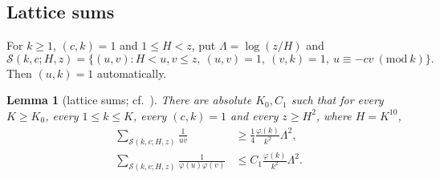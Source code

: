 \documentclass[10pt,reqno]{amsart}
\newtheorem{lemma}[theorem]{Lemma}
\theoremstyle{remark}
\newcommand{\Sset}{\mathcal S}
\begin{document}
\subsection*{Lattice sums}
For $k\geq1$, $(c,k)=1$ and $1\leq H<z$, put $\Lambda=\log(z/H)$ and
\[
 \Sset(k,c;H,z)=\{(u,v):H<u,v\leq z,\ (u,v)=1,\ (v,k)=1,\
 u\equiv-cv\ (\mathrm{mod}\ k)\}.
\]
Then $(u,k)=1$ automatically.

\begin{lemma}[lattice sums; cf.\ {\cite[Lemma~3.1]{LL}}]\label{lem:lattice}
There are absolute $K_0,C_1$ such that for every $K\geq K_0$, every
$1\leq k\leq K$, every $(c,k)=1$ and every $z\geq H^2$, where $H=K^{10}$,
\begin{align}
 \sum_{\Sset(k,c;H,z)}\frac1{uv}
 &\geq\frac14\frac{\varphi(k)}{k^2}\Lambda^2,\label{eq:latlower}\\
 \sum_{\Sset(k,c;H,z)}\frac1{\varphi(u)\varphi(v)}
 &\leq C_1\frac{\varphi(k)}{k^2}\Lambda^2.\label{eq:latupper}
\end{align}
\end{lemma}
\end{document}

